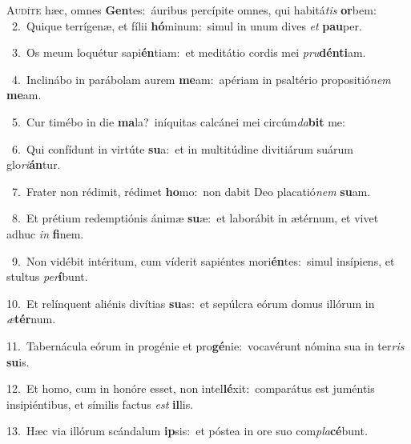 \lettrine{\initial\textcolor{\initialcolor}{A}}{udíte} hæc, omnes \textbf{Gen}\-tes:~\star áuribus percípite omnes, qui habitá\textit{tis} \textbf{or}\-bem:\\
{\numbfont\textcolor{\numbcolor}{~2.}}~Quique terrígenæ, et fílii \textbf{hó}\-minum:~\star simul in unum dives \textit{et} \textbf{pau}\-per.\par
{\numbfont\textcolor{\numbcolor}{~3.}}~Os meum loquétur sapi\-\textbf{én}\-tiam:~\star et meditátio cordis mei \textit{pru}\-\textbf{dén}\textbf{ti}am.\par
{\numbfont\textcolor{\numbcolor}{~4.}}~Inclinábo in parábolam aurem \textbf{me}\-am:~\star apériam in psaltério propositió\textit{nem} \textbf{me}\-am.\par
{\numbfont\textcolor{\numbcolor}{~5.}}~Cur timébo in die \textbf{ma}\-la?~\star iníquitas calcánei mei circúm\-\textit{da}\-\textbf{bit} me:\par
{\numbfont\textcolor{\numbcolor}{~6.}}~Qui confídunt in virtúte \textbf{su}\-a:~\star et in multitúdine divitiárum suárum glo\-\textit{ri}\-\textbf{án}tur.\par
{\numbfont\textcolor{\numbcolor}{~7.}}~Frater non rédimit, rédimet \textbf{ho}\-mo:~\star non dabit Deo placatió\textit{nem} \textbf{su}\-am.\par
{\numbfont\textcolor{\numbcolor}{~8.}}~Et prétium redemptiónis ánimæ \textbf{su}\-æ:~\star et laborábit in ætérnum, et vivet adhuc \textit{in} \textbf{fi}\-nem.\par
{\numbfont\textcolor{\numbcolor}{~9.}}~Non vidébit intéritum, cum víderit sapiéntes mori\-\textbf{én}\-tes:~\star simul insípiens, et stultus \textit{per}\-\textbf{í}bunt.\par
{\numbfont\textcolor{\numbcolor}{10.}}~Et relínquent aliénis divítias \textbf{su}\-as:~\star et sepúlcra eórum domus illórum in \textit{æ}\-\textbf{tér}num.\par
{\numbfont\textcolor{\numbcolor}{11.}}~Tabernácula eórum in progénie et pro\-\textbf{gé}\-nie:~\star vocavérunt nómina sua in ter\textit{ris} \textbf{su}\-is.\par
{\numbfont\textcolor{\numbcolor}{12.}}~Et homo, cum in honóre esset, non intel\-\textbf{lé}\-xit:~\star comparátus est juméntis insipiéntibus, et símilis factus \textit{est} \textbf{il}\-lis.\par
{\numbfont\textcolor{\numbcolor}{13.}}~Hæc via illórum scándalum \textbf{ip}\-sis:~\star et póstea in ore suo com\-\textit{pla}\-\textbf{cé}bunt.\par
